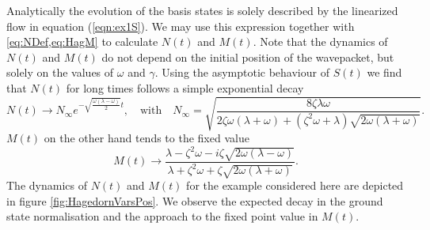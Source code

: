 \documentclass[12pt]{iopart} %
\begin{document}
Analytically the evolution of the basis states is solely described by the linearized flow in equation (\ref{eqn:ex1S}). We may use this expression together with \cref{eq:NDef,eq:HagM} to calculate $N(t)$ and $M(t)$. Note that the dynamics of $N(t)$ and $M(t)$ do not depend on the initial position of the wavepacket, but solely on the values of $\omega$ and $\gamma$. 
Using the asymptotic behaviour of $S(t)$ we find that $N(t)$ for long times follows a simple exponential decay
\begin{equation}
    N(t)\to N_{\infty}e^{- \sqrt{\frac{\omega  (\lambda -\omega )}{2}}t},\quad\text{with}\quad N_{\infty}=\sqrt{\frac{8 \zeta  \lambda  \omega }{2 \zeta  \omega  (\lambda+\omega)+ \left(\zeta ^2 \omega +\lambda \right) \sqrt{2 \omega  (\lambda +\omega )} }}.
\end{equation}
$M(t)$ on the other hand tends to the fixed value
\begin{equation}
    M(t)\to \frac{\lambda-\zeta ^2 \omega -i  \zeta  \sqrt{2 \omega  (\lambda -\omega )} }{\lambda+\zeta ^2 \omega + \zeta  \sqrt{2\omega  (\lambda +\omega
   )} }.
\end{equation}
The dynamics of $N(t)$ and $M(t)$ for the example considered here are depicted in figure \ref{fig:HagedornVarsPos}. We observe the expected decay in the ground state normalisation and the approach to the fixed point value in $M(t)$. 
\end{document}
